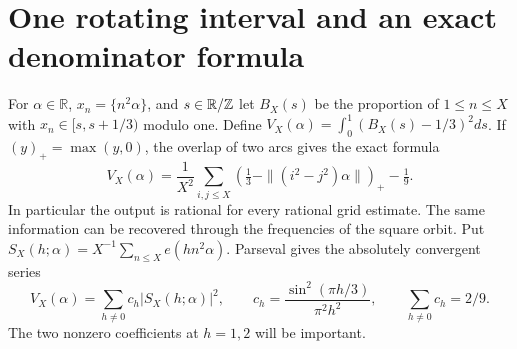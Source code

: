 \documentclass[11pt,a4paper,oneside,openany]{report}
\theoremstyle{remark}\newtheorem{remark}[theorem]{Remark}
\numberwithin{equation}{section}
\begin{document}
\section{One rotating interval and an exact denominator formula}\label{ch5:sec:sector}
For $\alpha\in\mathbb R$, $x_n=\{n^2\alpha\}$, and $s\in\mathbb R/\mathbb Z$ let $B_X(s)$ be the proportion of $1\le n\le X$ with $x_n\in[s,s+1/3)$ modulo one. Define $V_X(\alpha)=\int_0^1(B_X(s)-1/3)^2ds$. If $(y)_+=\max(y,0)$, the overlap of two arcs gives the exact formula
\begin{equation}\label{ch5:vsum}
 V_X(\alpha)=\frac1{X^2}\sum_{i,j\le X}\left(\tfrac13-\|(i^2-j^2)\alpha\|\right)_+-\tfrac19 .
\end{equation}
In particular the output is rational for every rational grid estimate. The same information can be recovered through the frequencies of the square orbit. Put $S_X(h;\alpha)=X^{-1}\sum_{n\le X}e(hn^2\alpha)$. Parseval gives the absolutely convergent series
\begin{equation}\label{ch5:four}
 V_X(\alpha)=\sum_{h\ne0}c_h|S_X(h;\alpha)|^2,\qquad
 c_h=\frac{\sin^2(\pi h/3)}{\pi^2h^2},\qquad \sum_{h\ne0}c_h=2/9 .
\end{equation}
The two nonzero coefficients at $h=1,2$ will be important.
\begin{center}
\end{center}
\end{document}
